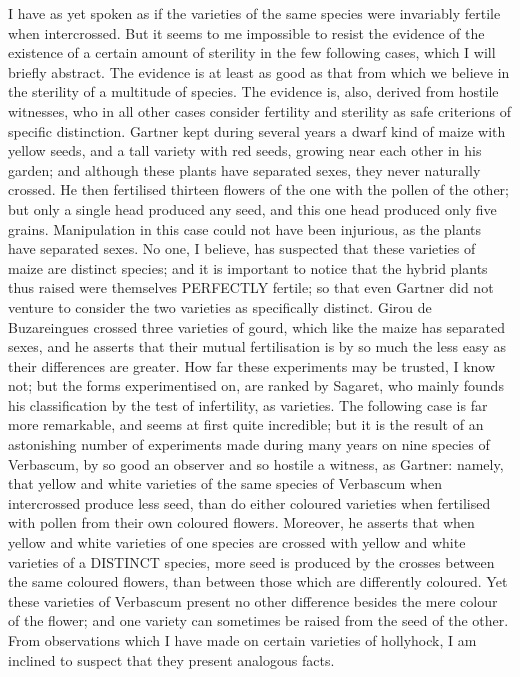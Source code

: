 I have as yet spoken as if the varieties of the same species were invariably fertile when intercrossed. But it seems to me impossible to resist the evidence of the existence of a certain amount of sterility in the few following cases, which I will briefly abstract. The evidence is at least as good as that from which we believe in the sterility of a multitude of species. The evidence is, also, derived from hostile witnesses, who in all other cases consider fertility and sterility as safe criterions of specific distinction. Gartner kept during several years a dwarf kind of maize with yellow seeds, and a tall variety with red seeds, growing near each other in his garden; and although these plants have separated sexes, they never naturally crossed. He then fertilised thirteen flowers of the one with the pollen of the other; but only a single head produced any seed, and this one head produced only five grains. Manipulation in this case could not have been injurious, as the plants have separated sexes. No one, I believe, has suspected that these varieties of maize are distinct species; and it is important to notice that the hybrid plants thus raised were themselves PERFECTLY fertile; so that even Gartner did not venture to consider the two varieties as specifically distinct.
Girou de Buzareingues crossed three varieties of gourd, which like the maize has separated sexes, and he asserts that their mutual fertilisation is by so much the less easy as their differences are greater. How far these experiments may be trusted, I know not; but the forms experimentised on, are ranked by Sagaret, who mainly founds his classification by the test of infertility, as varieties.
The following case is far more remarkable, and seems at first quite incredible; but it is the result of an astonishing number of experiments made during many years on nine species of Verbascum, by so good an observer and so hostile a witness, as Gartner: namely, that yellow and white varieties of the same species of Verbascum when intercrossed produce less seed, than do either coloured varieties when fertilised with pollen from their own coloured flowers. Moreover, he asserts that when yellow and white varieties of one species are crossed with yellow and white varieties of a DISTINCT species, more seed is produced by the crosses between the same coloured flowers, than between those which are differently coloured. Yet these varieties of Verbascum present no other difference besides the mere colour of the flower; and one variety can sometimes be raised from the seed of the other.
From observations which I have made on certain varieties of hollyhock, I am inclined to suspect that they present analogous facts.
